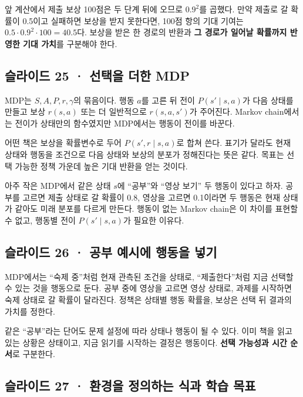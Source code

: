 \documentclass[11pt,a4paper]{article}
\begin{document}
앞 계산에서 제출 보상 100점은 두 단계 뒤에 오므로 $0.9^2$를 곱했다. 만약 제출로 갈 확률이 0.5이고 실패하면 보상을 받지 못한다면, 100점 항의 기대 기여는 $0.5\cdot0.9^2\cdot100=40.5$다. 보상을 받은 한 경로의 반환과 \textbf{그 경로가 일어날 확률까지 반영한 기대 가치}를 구분해야 한다.\par

\subsection{슬라이드 25 · 선택을 더한 MDP}

MDP는 $S,A,P,r,\gamma$의 묶음이다. 행동 $a$를 고른 뒤 전이 $P(s'\mid s,a)$가 다음 상태를 만들고 보상 $r(s,a)$ 또는 더 일반적으로 $r(s,a,s')$가 주어진다. Markov chain에서는 전이가 상태만의 함수였지만 MDP에서는 행동이 전이를 바꾼다.\par

어떤 책은 보상을 확률변수로 두어 $P(s',r\mid s,a)$로 합쳐 쓴다. 표기가 달라도 현재 상태와 행동을 조건으로 다음 상태와 보상의 분포가 정해진다는 뜻은 같다. 목표는 선택 가능한 정책 가운데 높은 기대 반환을 얻는 것이다.\par

아주 작은 MDP에서 같은 상태 $s$에 “공부”와 “영상 보기” 두 행동이 있다고 하자. 공부를 고르면 제출 상태로 갈 확률이 0.8, 영상을 고르면 0.1이라면 두 행동은 현재 상태가 같아도 미래 분포를 다르게 만든다. 행동이 없는 Markov chain은 이 차이를 표현할 수 없고, 행동별 전이 $P(s'\mid s,a)$가 필요한 이유다.\par

\subsection{슬라이드 26 · 공부 예시에 행동을 넣기}

MDP에서는 “숙제 중”처럼 현재 관측된 조건을 상태로, “제출한다”처럼 지금 선택할 수 있는 것을 행동으로 둔다. 공부 중에 영상을 고르면 영상 상태로, 과제를 시작하면 숙제 상태로 갈 확률이 달라진다. 정책은 상태별 행동 확률을, 보상은 선택 뒤 결과의 가치를 정한다.\par

같은 “공부”라는 단어도 문제 설정에 따라 상태나 행동이 될 수 있다. 이미 책을 읽고 있는 상황은 상태이고, 지금 읽기를 시작하는 결정은 행동이다. \textbf{선택 가능성과 시간 순서}로 구분한다.\par

\subsection{슬라이드 27 · 환경을 정의하는 식과 학습 목표}
\end{document}
